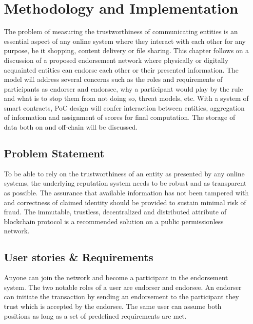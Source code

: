 \chapter{Methodology and Implementation} \label{ch:method}
The problem of measuring the trustworthiness of communicating entities is an
essential aspect of any online system where they interact with each other for
any purpose, be it shopping, content delivery or file sharing. This chapter
follows on a discussion of a proposed endorsement network where physically or
digitally acquainted entities can endorse each other or their presented
information. The model will address several concerns such as the roles and
requirements of participants as endorser and endorsee, why a participant would
play by the rule and what is to stop them from not doing so, threat models,
etc. With a system of smart contracts, PoC design will confer interaction
between entities, aggregation of information and assignment of scores for final
computation. The storage of data both on and off-chain will be discussed.  

\section{Problem Statement}
To be able to rely on the trustworthiness of an entity as presented by any
online systems, the underlying reputation system needs to be robust and as
transparent as possible. The assurance that available information has not been
tampered with and correctness of claimed identity should be provided to sustain
minimal risk of fraud. The immutable, trustless, decentralized and distributed
attribute of blockchain protocol is a recommended solution on a public
permissionless network.

\section{ User stories \& Requirements} \label{ch:UserStories}
Anyone can join the network and become a participant in the endorsement system.
The two notable roles of a user are endorser and endorsee. An endorser can
initiate the transaction by sending an endorsement to the participant they
trust which is accepted by the endorsee.  The same user can assume both
positions as long as a set of predefined requirements are met.  \\ 


